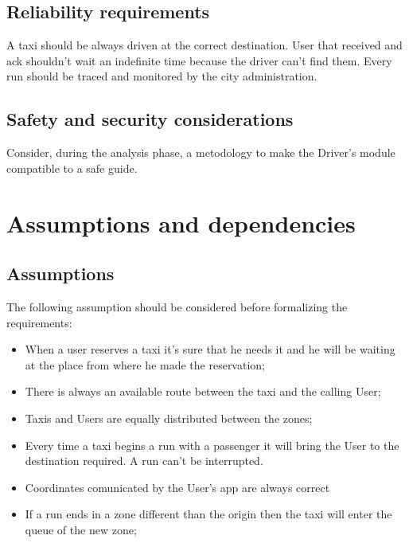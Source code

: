 \documentclass[12pt,a4paper]{book}
\begin{document}
			\subsection{Reliability requirements}
			A taxi should be always driven at the correct destination. User that received and ack shouldn't wait an indefinite time because the driver can't find them.
			Every run should be traced and monitored by the city administration.
			\subsection{Safety and security considerations}
			Consider, during the analysis phase, a metodology to make the Driver's module compatible to a safe guide.
		\section{Assumptions and dependencies}
			\subsection{Assumptions}
			The following assumption should be considered before formalizing the requirements:
			\begin{itemize}
				\item[\textbullet] When a user reserves a taxi it's sure that he needs it and he will be waiting at the place from where he made the reservation;
				\item[\textbullet] There is always an available route between the taxi and the calling User;
				\item[\textbullet] Taxis and Users are equally distributed between the zones;
				\item[\textbullet] Every time a taxi begins a run with a passenger it will bring the User to the destination required. A run can't be interrupted.
				\item[\textbullet] Coordinates comunicated by the User's app are always correct
				\item[\textbullet] If a run ends in a zone different than the origin then the taxi will enter the queue of the new zone;
			\end{itemize}
\end{document}
